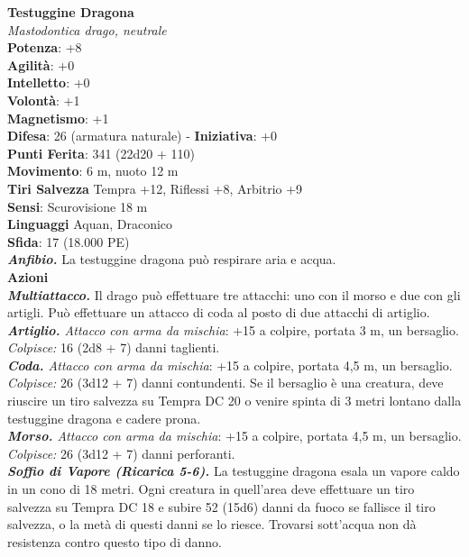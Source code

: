 \begin{multicols}{2}
\medskip\textbf{Testuggine Dragona}\\
\emph{Mastodontica drago, neutrale}\\
\textbf{Potenza}: +8\\
\textbf{Agilità}: +0\\
\textbf{Intelletto}: +0\\
\textbf{Volontà}: +1\\
\textbf{Magnetismo}: +1\\
\textbf{Difesa}: 26 (armatura naturale) - \textbf{Iniziativa}: +0\\
\textbf{Punti Ferita}: 341 (22d20 + 110)\\
\textbf{Movimento}: 6 m, nuoto 12 m\\
\textbf{Tiri Salvezza} Tempra +12, Riflessi +8, Arbitrio +9\\
\textbf{Sensi}: Scurovisione 18 m\\
\textbf{Linguaggi} Aquan, Draconico\\
\textbf{Sfida}: 17 (18.000 PE)\smallskip\\
\emph{\textbf{Anfibio.}} La testuggine dragona può respirare aria e acqua.\\
\smallskip\textbf{Azioni}\\
\emph{\textbf{Multiattacco.}} Il drago può effettuare tre attacchi: uno con il morso e due con gli artigli. Può effettuare un attacco di coda al posto di due attacchi di artiglio.\\
\emph{\textbf{Artiglio.} Attacco con arma da mischia}: +15 a colpire, portata 3 m, un bersaglio.\\
\emph{Colpisce:} 16 (2d8 + 7) danni taglienti. \\
\emph{\textbf{Coda.} Attacco con arma da mischia}: +15 a colpire, portata 4,5 m, un bersaglio.\\
\emph{Colpisce:} 26 (3d12 + 7) danni contundenti. Se il bersaglio è una creatura, deve riuscire un tiro salvezza su Tempra DC 20 o venire spinta di 3 metri lontano dalla testuggine dragona e cadere prona. \\
\emph{\textbf{Morso.} Attacco con arma da mischia}: +15 a colpire, portata 4,5 m, un bersaglio.\\
\emph{Colpisce:} 26 (3d12 + 7) danni perforanti. \\
\emph{\textbf{Soffio di Vapore (Ricarica 5-6).}} La testuggine dragona esala un vapore caldo in un cono di 18 metri. Ogni creatura in quell'area deve effettuare un tiro salvezza su Tempra DC 18 e subire 52 (15d6) danni da fuoco se fallisce il tiro salvezza, o la metà di questi danni se lo riesce. Trovarsi sott'acqua non dà resistenza contro questo tipo di danno.\\

\end{multicols}
